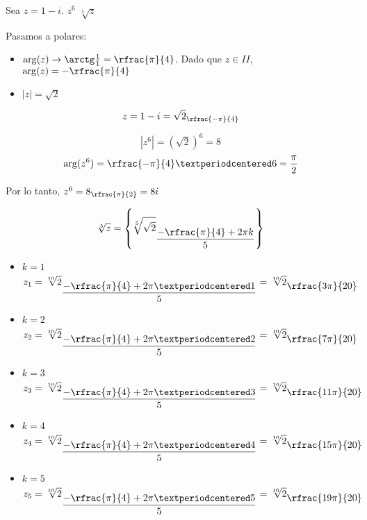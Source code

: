 \documentclass[palatino,nosec,nochap,nobuilddate]{Docencia}
\begin{document}
\begin{problem}

Sea $z=1-i$.
\ppart $z^6$
\ppart $\sqrt[5]{z}$

\solution

Pasamos a polares: 
\begin{itemize}
	\item $\arg(z) \to \arctg\frac{1}{1} = \rfrac{\pi}{4}$. Dado que $z\in II$, $\arg(z) = -\rfrac{\pi}{4}$
	\item $|z| = \sqrt{2}$
\end{itemize}

\[z = 1-i = \sqrt{2}_{\rfrac{-\pi}{4}}\]

\spart

\[|z^6| = \left(\sqrt{2}\right)^6 = 8\]
\[\arg(z^6) = \rfrac{-\pi}{4}·6 = \frac{\pi}{2}\]

Por lo tanto, $z^6 = 8_{\rfrac{\pi}{2}} = 8i$

\spart 
\[\sqrt[5]{z} = \left\{ \sqrt[5]{\sqrt{2}}_{\displaystyle\frac{-\rfrac{\pi}{4}+2\pi k}{5}} \right\}\]
\begin{itemize}
	\item $k=1$
	\[z_1 = \sqrt[10]{2}_{\displaystyle\frac{-\rfrac{\pi}{4}+2\pi ·1}{5}} = \sqrt[10]{2}_{\displaystyle\rfrac{3\pi}{20}}\]
	\item $k=2$
	\[z_2 = \sqrt[10]{2}_{\displaystyle\frac{-\rfrac{\pi}{4}+2\pi ·2}{5}} = \sqrt[10]{2}_{\displaystyle\rfrac{7\pi}{20}}\]
	\item $k=3$
	\[z_3 = \sqrt[10]{2}_{\displaystyle\frac{-\rfrac{\pi}{4}+2\pi ·3}{5}} = \sqrt[10]{2}_{\displaystyle\rfrac{11\pi}{20}}\]
	\item $k=4$
	\[z_4 = \sqrt[10]{2}_{\displaystyle\frac{-\rfrac{\pi}{4}+2\pi ·4}{5}} = \sqrt[10]{2}_{\displaystyle\rfrac{15\pi}{20}}\]
	\item $k=5$
	\[z_5 = \sqrt[10]{2}_{\displaystyle\frac{-\rfrac{\pi}{4}+2\pi ·5}{5}} = \sqrt[10]{2}_{\displaystyle\rfrac{19\pi}{20}}\]
\end{itemize}


\end{problem}
\end{document}
